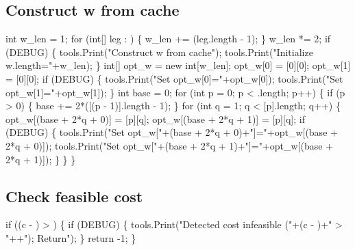 \subsection{Construct w from cache}
\nwenddocs{}\endmoddef\nwstartdeflinemarkup{}\nwenddeflinemarkup
int w_len = 1;
for (int[] leg : ) \{
  w_len += (leg.length - 1);
\}
w_len *= 2;
if (DEBUG) \{
  tools.Print("Construct w from cache");
  tools.Print("Initialize w.length="+w_len);
\}
int[] opt_w = new int[w_len];
opt_w[0] = [0][0];
opt_w[1] = [0][0];
if (DEBUG) \{
  tools.Print("Set opt_w[0]="+opt_w[0]);
  tools.Print("Set opt_w[1]="+opt_w[1]);
\}
int base = 0;
for (int p = 0; p < .length; p++) \{
  if (p > 0) \{
    base += 2*([(p - 1)].length - 1);
  \}
  for (int q = 1; q < [p].length; q++) \{
    opt_w[(base + 2*q + 0)] = [p][q];
    opt_w[(base + 2*q + 1)] = [p][q];
    if (DEBUG) \{
      tools.Print("Set opt_w["+(base + 2*q + 0)+"]="+opt_w[(base + 2*q + 0)]);
      tools.Print("Set opt_w["+(base + 2*q + 1)+"]="+opt_w[(base + 2*q + 1)]);
    \}
  \}
\}
\nwendcode{}\nwdocspar

\subsection{Check feasible cost}
\nwenddocs{}\endmoddef\nwstartdeflinemarkup{}\nwenddeflinemarkup
if ((c - ) > ) \{
  if (DEBUG) \{
    tools.Print("Detected cost infeasible ("+(c - )+" > "++"); Return");
  \}
  return -1;
\}
\nwendcode{}\nwdocspar

